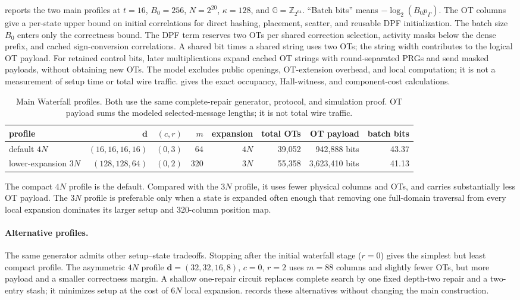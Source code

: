  reports the two main profiles at $t=16$,
$B_0=256$, $N=2^{20}$, $\kappa=128$, and $\mathbb G=\mathbb Z_{2^{64}}$. ``Batch
bits'' means $-\log_2(B_0p_\Gamma)$. The OT columns give a per-state upper
bound on initial correlations for direct hashing, placement, scatter, and
reusable DPF initialization. The batch size $B_0$ enters only the correctness
bound.
The DPF term reserves two OTs per shared correction selection, activity
masks below the dense prefix, and cached sign-conversion correlations.
A shared bit times a shared string uses two OTs; the string width contributes
to the logical OT payload. For retained control bits, later multiplications
expand cached OT strings with round-separated PRGs and send masked payloads,
without obtaining new OTs. The model excludes public openings, OT-extension
overhead, and local computation; it is not a measurement of setup time or
total wire traffic.
 gives the exact
occupancy, Hall-witness, and component-cost calculations.

\begin{table}[H]
\centering
\footnotesize
\setlength{\tabcolsep}{4pt}
\begin{tabular}{@{}lrrrrrrr@{}}
\toprule
profile & $\mathbf d$ & $(c,r)$ & $m$ & expansion & total OTs & OT payload & batch bits \\
\midrule
default $4N$ & $(16,16,16,16)$ & $(0,3)$ & 64 & $4N$ & 39{,}052 & 942{,}888 bits & 43.37 \\
lower-expansion $3N$ & $(128,128,64)$ & $(0,2)$ & 320 & $3N$ & 55{,}358 & 3{,}623{,}410 bits & 41.13 \\
\bottomrule
\end{tabular}
\caption{Main Waterfall profiles.  Both use the same complete-repair generator,
protocol, and simulation proof.  OT payload sums the modeled selected-message lengths; it is not total wire traffic.
\label{tab:waterfall-parameters}\label{tab:waterfall-mpc-cost}}
\end{table}

The compact $4N$ profile is the default. Compared with the $3N$ profile, it
uses fewer physical columns and OTs, and carries substantially less OT payload.
The $3N$ profile
is preferable only when a state is expanded often enough that removing one
full-domain traversal from every local expansion dominates its larger setup
and 320-column position map.

\paragraph{Alternative profiles.}
The same generator admits other setup--state tradeoffs.  Stopping after the
initial waterfall stage ($r=0$) gives the simplest but least compact profile.
The asymmetric $4N$ profile $\mathbf d=(32,32,16,8)$, $c=0$, $r=2$ uses
$m=88$ columns and slightly fewer OTs, but more payload and a smaller
correctness margin.  A shallow one-repair circuit replaces complete search by
one fixed depth-two repair and a two-entry stash; it minimizes setup at the
cost of $6N$ local expansion.   records
these alternatives without changing the main construction.
